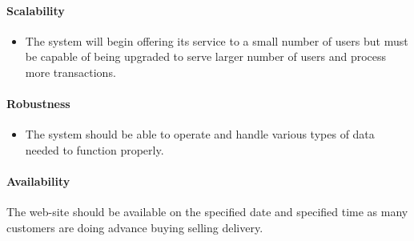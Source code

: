 \paragraph{Scalability}
\begin{itemize}
	\item The system will begin offering its service to a small number of users but must be capable of being upgraded to serve larger number of users and process more transactions.
\end{itemize}

\paragraph{Robustness}
\begin{itemize}
	\item The system should be able to operate and handle various types of data needed to function properly.
\end{itemize}



\paragraph{Availability}
The web-site should be available on the specified date and specified time as many customers are doing advance buying selling delivery.



